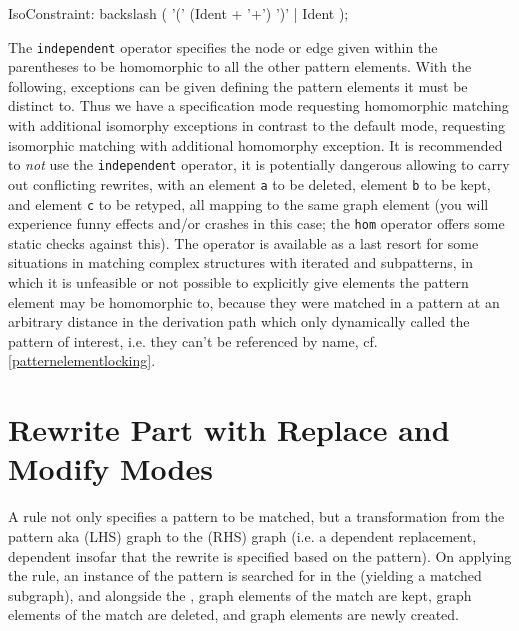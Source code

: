 \begin{rail}
  IsoConstraint: backslash ( '(' (Ident + '+')  ')' | Ident );
\end{rail}

The \texttt{independent} operator specifies the node or edge given within the parentheses to be homomorphic to all the other pattern elements.
With the  following, exceptions can be given defining the pattern elements it must be distinct to.
Thus we have a specification mode requesting homomorphic matching with additional isomorphy exceptions in contrast to the default mode,
requesting isomorphic matching with additional homomorphy exception.
It is recommended to \emph{not} use the \texttt{independent} operator, it is potentially dangerous allowing to carry out conflicting rewrites, with an element \texttt{a} to be deleted, element \texttt{b} to be kept, and element \texttt{c} to be retyped, all mapping to the same graph element (you will experience funny effects and/or crashes in this case; the \texttt{hom} operator offers some static checks against this).
The operator is available as a last resort for some situations in matching complex structures with iterated and subpatterns, 
in which it is unfeasible or not possible to explicitly give elements the pattern element may be homomorphic to,
because they were matched in a pattern at an arbitrary distance in the derivation path which only dynamically called the pattern of interest,
i.e. they can't be referenced by name, cf. \ref{patternelementlocking}.


\section{Rewrite Part with Replace and Modify Modes}
\label{sec:replacemodify}
A rule not only specifies a pattern to be matched, but a transformation from the pattern aka  (LHS) graph to the  (RHS) graph (i.e. a dependent replacement, dependent insofar that the rewrite is specified based on the pattern).
On applying the rule, an instance of the pattern is searched for in the  (yielding a matched subgraph), and alongside the , graph elements of the match are kept, graph elements of the match are deleted, and graph elements are newly created.


